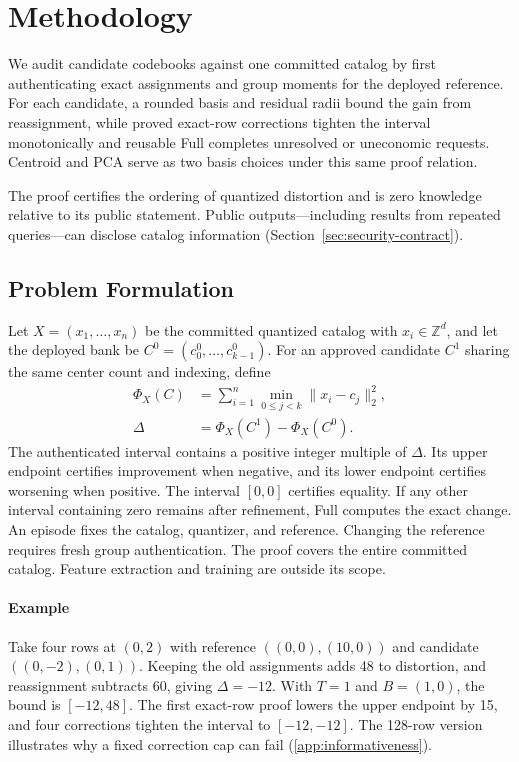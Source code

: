 \documentclass[5p,times,twocolumn]{elsarticle}
\begin{document}
\section{Methodology}
\label{sec:methodology}
We audit candidate codebooks against one committed catalog by first authenticating exact assignments and group moments for the deployed reference. For each candidate, a rounded basis and residual radii bound the gain from reassignment, while proved exact-row corrections tighten the interval monotonically and reusable Full completes unresolved or uneconomic requests. Centroid and PCA serve as two basis choices under this same proof relation.

The proof certifies the ordering of quantized distortion and is zero knowledge relative to its public statement. Public outputs—including results from repeated queries—can disclose catalog information (Section~\ref{sec:security-contract}).

\subsection{Problem Formulation}
\label{sec:methodology-problem}
Let $X=(x_1,\ldots,x_n)$ be the committed quantized catalog with $x_i\in\mathbb Z^d$, and let the deployed bank be $C^0=(c^0_0,\ldots,c^0_{k-1})$. For an approved candidate $C^1$ sharing the same center count and indexing, define
\begin{equation}
 \begin{aligned}
 \Phi_X(C)&=\sum_{i=1}^{n}\min_{0\leq j<k}\|x_i-c_j\|_2^2,\\
 \Delta&=\Phi_X(C^1)-\Phi_X(C^0).
 \end{aligned}
 \label{eq:methodology-objective}
\end{equation}
The authenticated interval contains a positive integer multiple of $\Delta$.
Its upper endpoint certifies improvement when negative, and its lower
endpoint certifies worsening when positive. The interval $[0,0]$ certifies
equality. If any other interval containing zero remains after refinement,
Full computes the exact change. An episode fixes the catalog, quantizer,
and reference. Changing the reference requires fresh group authentication.
The proof covers the entire committed catalog. Feature extraction and
training are outside its scope.

\paragraph{Example}
Take four rows at $(0,2)$ with reference $((0,0),(10,0))$ and
candidate $((0,-2),(0,1))$. Keeping the old assignments adds 48 to
distortion, and reassignment subtracts 60, giving $\Delta=-12$.
With $T=1$ and $B=(1,0)$, the bound is $[-12,48]$. The first exact-row
proof lowers the upper endpoint by 15, and four corrections tighten
the interval to $[-12,-12]$. The 128-row version illustrates why
a fixed correction cap can fail (\ref{app:informativeness}).
\end{document}
